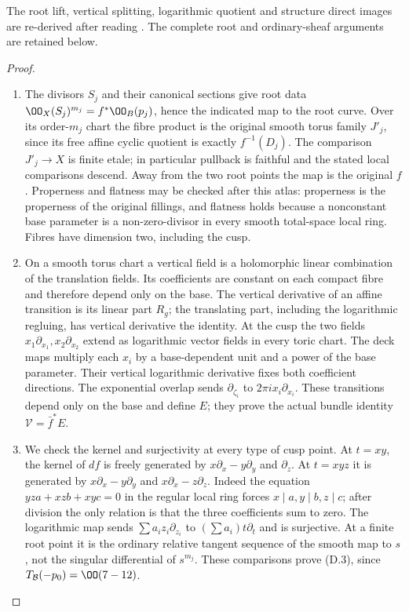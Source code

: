 The root lift, vertical splitting, logarithmic quotient and
structure direct images are re-derived after reading
\citet[Lemmas~6.2 and 6.7; Propositions~6.6 and 6.10]{DuEtAl2026v1}.
The complete root and ordinary-sheaf arguments are retained below.

\begin{proof}
\begin{enumerate}[label=\arabic*.,leftmargin=*]
\item The divisors $S_j$ and their canonical sections give root data
$\OO_X(S_j)^{m_j}=f^*\OO_B(p_j)$, hence the indicated map to the root
curve. Over its order-$m_j$ chart the fibre product is the original
smooth torus family $J'_j$, since its free affine cyclic quotient is
exactly $f^{-1}(D_j)$. The comparison $J'_j\to X$ is finite etale;
in particular pullback is faithful and the stated local comparisons
descend. Away from the two root points the map is the original $f$.
Properness and flatness may be checked after this atlas: properness is
the properness of the original fillings, and flatness holds because a
nonconstant base parameter is a non-zero-divisor in every smooth
total-space local ring. Fibres have dimension two, including the cusp.

\item On a smooth torus chart a vertical field is a holomorphic linear
combination of the translation fields. Its coefficients are constant
on each compact fibre and therefore depend only on the base. The
vertical derivative of an affine transition is its linear part $R_g$;
the translating part, including the logarithmic regluing, has vertical
derivative the identity. At the cusp the two fields
$x_1\partial_{x_1},x_2\partial_{x_2}$ extend as logarithmic vector
fields in every toric chart. The deck maps multiply each $x_i$ by a
base-dependent unit and a power of the base parameter. Their vertical
logarithmic derivative fixes both coefficient directions. The
exponential overlap sends $\partial_{\zeta_i}$ to
$2\pi i x_i\partial_{x_i}$. These transitions depend only on the base
and define $E$; they prove the actual bundle identity
$\mathcal V=\bar f^*E$.

\item We check the kernel and surjectivity at every type of cusp point. At
$t=xy$, the kernel of $df$ is freely generated by
$x\partial_x-y\partial_y$ and $\partial_z$. At $t=xyz$ it is generated
by $x\partial_x-y\partial_y$ and $x\partial_x-z\partial_z$.
Indeed the equation $yz a+xz b+xy c=0$ in the regular local ring forces
$x\mid a,y\mid b,z\mid c$; after division the only relation is that
the three coefficients sum to zero. The logarithmic map sends
$\sum a_i z_i\partial_{z_i}$ to $(\sum a_i)t\partial_t$ and is
surjective. At a finite root point it is the ordinary relative tangent
sequence of the smooth map to $s$, not the singular differential of
$s^{m_j}$. These comparisons prove (D.3), since
$T_{\mathcal B}(-p_0)=\OO(7-12)$.


\end{enumerate}
\end{proof}
